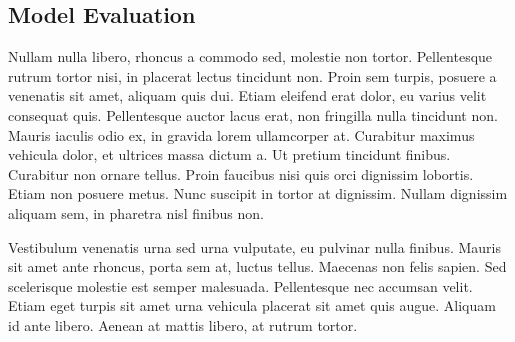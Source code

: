 \subsection{Model Evaluation}

Nullam nulla libero, rhoncus a commodo sed, molestie non tortor. Pellentesque rutrum tortor nisi, in placerat lectus tincidunt non. Proin sem turpis, posuere a venenatis sit amet, aliquam quis dui. Etiam eleifend erat dolor, eu varius velit consequat quis. Pellentesque auctor lacus erat, non fringilla nulla tincidunt non. Mauris iaculis odio ex, in gravida lorem ullamcorper at. Curabitur maximus vehicula dolor, et ultrices massa dictum a. Ut pretium tincidunt finibus. Curabitur non ornare tellus. Proin faucibus nisi quis orci dignissim lobortis. Etiam non posuere metus. Nunc suscipit in tortor at dignissim. Nullam dignissim aliquam sem, in pharetra nisl finibus non.

Vestibulum venenatis urna sed urna vulputate, eu pulvinar nulla finibus. Mauris sit amet ante rhoncus, porta sem at, luctus tellus. Maecenas non felis sapien. Sed scelerisque molestie est semper malesuada. Pellentesque nec accumsan velit. Etiam eget turpis sit amet urna vehicula placerat sit amet quis augue. Aliquam id ante libero. Aenean at mattis libero, at rutrum tortor.
